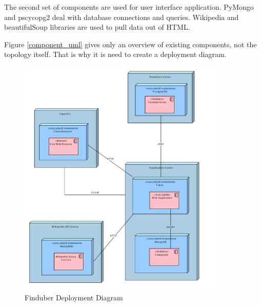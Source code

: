 The second set of components are used for user interface application. PyMongo and pscycopg2 deal with database connections and queries. Wikipedia and beautifulSoup libraries are used to pull data out of HTML. 

Figure \ref{component_uml} gives only an overview of existing components, not the topology itself. That is why it is need to create a deployment diagram. 

\begin{figure}[!ht]
\centering
\includegraphics[width=10cm]{Deployment}
\caption{Finduber Deployment Diagram}\label{deploy_uml}
\end{figure}









 






